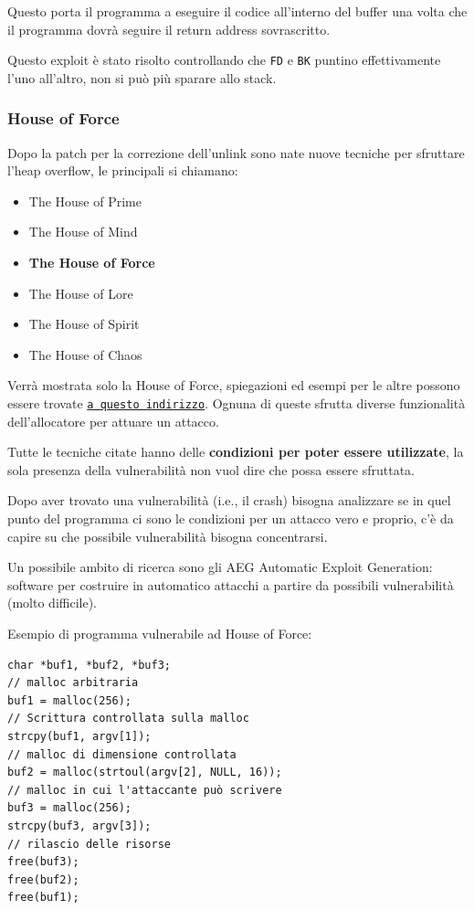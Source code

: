 Questo porta il programma a eseguire il codice all'interno del buffer una volta che il programma dovrà seguire il return address sovrascritto.

Questo exploit è stato risolto controllando che \texttt{FD} e \texttt{BK} puntino effettivamente l'uno all'altro, non si può più sparare allo stack.

\subsubsection{House of Force}

Dopo la patch per la correzione dell'unlink sono nate nuove tecniche per sfruttare l'heap overflow, le principali si chiamano:
\begin{itemize}
	\item The House of Prime

	\item The House of Mind

	\item \textbf{The House of Force}

	\item The House of Lore

	\item The House of Spirit

	\item The House of Chaos
\end{itemize}

Verrà mostrata solo la House of Force, spiegazioni ed esempi per le altre possono essere trovate \href{https://github.com/shellphish/how2heap}{\texttt{a questo indirizzo}}. Ognuna di queste sfrutta diverse funzionalità dell'allocatore per attuare un attacco.

Tutte le tecniche citate hanno delle \textbf{condizioni per poter essere utilizzate}, la sola presenza della vulnerabilità non vuol dire che possa essere sfruttata.

Dopo aver trovato una vulnerabilità (i.e., il crash) bisogna analizzare se in quel punto del programma ci sono le condizioni per un attacco vero e proprio, c'è da capire su che possibile vulnerabilità bisogna concentrarsi.

Un possibile ambito di ricerca sono gli AEG Automatic Exploit Generation: software per costruire in automatico attacchi a partire da possibili vulnerabilità (molto difficile).

Esempio di programma vulnerabile ad House of Force:
\begin{verbatim}
char *buf1, *buf2, *buf3;
// malloc arbitraria
buf1 = malloc(256);
// Scrittura controllata sulla malloc
strcpy(buf1, argv[1]); 
// malloc di dimensione controllata
buf2 = malloc(strtoul(argv[2], NULL, 16));
// malloc in cui l'attaccante può scrivere
buf3 = malloc(256);
strcpy(buf3, argv[3]);
// rilascio delle risorse
free(buf3);
free(buf2);
free(buf1);
\end{verbatim}

